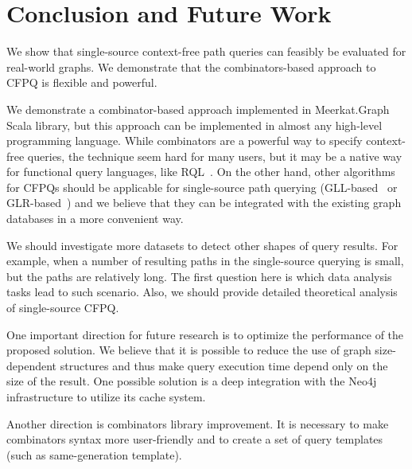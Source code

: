 \section{Conclusion and Future Work}

We show that single-source context-free path queries can feasibly be evaluated for real-world graphs.
We demonstrate that the combinators-based approach to CFPQ is flexible and powerful.

We demonstrate a combinator-based approach implemented in Meerkat.Graph Scala library, but this approach can be implemented in almost any high-level programming language.
While combinators are a powerful way to specify context-free queries, the technique seem hard for many users, but it may be a native way for functional query languages, like RQL~\cite{Karvounarakis2004}. 
On the other hand, other algorithms for CFPQs should be applicable for single-source path querying (GLL-based~\cite{Grigorev:2017:CPQ:3166094.3166104, MEDEIROS201975} or GLR-based~\cite{10.1007/978-3-319-41579-6_22, 10.1007/978-3-319-91662-0_17}) and we believe that they can be integrated with the existing graph databases in a more convenient way.

We should investigate more datasets to detect other shapes of query results.
For example, when a number of resulting paths in the single-source querying is small, but the paths are relatively long.
The first question here is which data analysis tasks lead to such scenario.
Also, we should provide detailed theoretical analysis of single-source CFPQ.

One important direction for future research is to optimize the performance of the proposed solution.
We believe that it is possible to reduce the use of graph size-dependent structures and thus make query execution time depend only on the size of the result.
One possible solution is a deep integration with the Neo4j infrastructure to utilize its cache system.

Another direction is combinators library improvement.
It is necessary to make combinators syntax more user-friendly and to create a set of query templates (such as same-generation template).